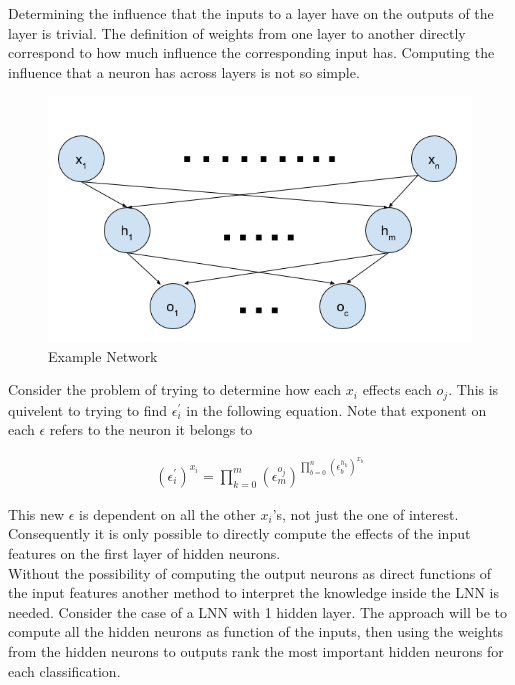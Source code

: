 Determining the influence that the inputs to a layer have on the outputs of the layer is trivial. The definition of weights from one layer to another directly correspond to how much influence the corresponding input has. Computing the influence that a neuron has across layers is not so simple.

\begin{figure}[H]
	\centering
	\begin{minipage}[b]{0.5\textwidth}
		\includegraphics[width=\textwidth]{NetworkExample.png}
		\caption{Example Network}
		\label{fig:network-example}
	\end{minipage}
	\hfill
\end{figure}

Consider the problem of trying to determine how each $x_i$ effects each $o_j$. This is quivelent to trying to find $\epsilon^{'}_i$ in the following equation. Note that exponent on each $\epsilon$ refers to the neuron it belongs to

\begin{align*}
	(\epsilon^{'}_i)^{x_i} = \prod_{k = 0}^{m} (\epsilon^{o_j}_m)^{\prod_{b = 0}^{n} (\epsilon^{h_k}_b)^{x_b}}
\end{align*}

This new $\epsilon$ is dependent on all the other $x_i$'s, not just the one of interest. Consequently it is only possible to directly compute the effects of the input features on the first layer of hidden neurons.\\

Without the possibility of computing the output neurons as direct functions of the input features another method to interpret the knowledge inside the LNN is needed. Consider the case of a LNN with 1 hidden layer. The approach will be to compute all the hidden neurons as function of the inputs, then using the weights from the hidden neurons to outputs rank the most important hidden neurons for each classification.\\

